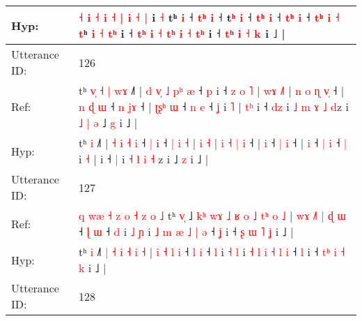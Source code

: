 \documentclass[10pt]{article}
\DeclareRobustCommand{\hl}[1]{{\textcolor{red}{#1}}}
\begin{document}
\begin{longtable}{ll}
 \\
Hyp: & \hl{}\hl{}\hl{˧} \hl{i} \hl{˧} \hl{i} \hl{˧} \hl{}\hl{|} \hl{i} \hl{˧} \hl{|} i\hl{}\hl{}\hl{}\hl{} \hl{}\hl{˧} tʰ \hl{}\hl{i} ˧ \hl{t}\hl{ʰ} \hl{i} ˧\hl{}\hl{} t\hl{ʰ} \hl{i} ˧ \hl{t}\hl{ʰ}\hl{ }\hl{i} ˧ \hl{t}\hl{ʰ} \hl{i} ˧ \hl{}\hl{t}\hl{ʰ} \hl{}\hl{i} \hl{˧} \hl{t}ʰ \hl{i} \hl{˧} \hl{}\hl{t}\hl{ʰ} i ˧\hl{}\hl{} \hl{t}\hl{ʰ} \hl{i} \hl{˧} \hl{}\hl{t}\hl{ʰ} \hl{i} \hl{˧} \hl{}\hl{t}\hl{ʰ} i ˧ \hl{t}\hl{ʰ} \hl{i} \hl{˧} \hl{k} i ˩ |
 \\
\midrule
Utterance ID: & 126 \\
Ref: & tʰ\hl{ }\hl{v}\hl{̩}\hl{ }\hl{˧}\hl{ }\hl{|} \hl{w}\hl{ɤ} ˩˥ |\hl{ }\hl{d} \hl{v}\hl{̩} \hl{˩} \hl{p}\hl{ʰ} \hl{æ} ˧ \hl{p} i ˧ \hl{z} \hl{o} \hl{˥} | \hl{w}\hl{ɤ} \hl{˩}\hl{˥} | \hl{n} \hl{o} \hl{ɳ} \hl{v}\hl{̩} ˧ |\hl{ }\hl{n}\hl{ }\hl{ɖ} \hl{ɯ} ˧ \hl{n} \hl{j}\hl{ɤ} ˧ |\hl{ }\hl{ʈ}\hl{ʂ}\hl{ʰ} \hl{ɯ} ˧ \hl{n} \hl{e} ˧ \hl{ʝ} i \hl{˥} |\hl{ }\hl{t}\hl{ʰ} i ˧ \hl{d}\hl{z} i \hl{˩} \hl{m} \hl{ɤ} \hl{˩} \hl{d}z i\hl{ }\hl{˩}\hl{ }\hl{|}\hl{ }\hl{ə} ˩ \hl{g} i ˩ |
 \\
Hyp: & tʰ\hl{}\hl{}\hl{}\hl{}\hl{}\hl{}\hl{} \hl{}\hl{i} ˩˥ |\hl{}\hl{} \hl{}\hl{˧} \hl{i} \hl{}\hl{˧} \hl{i} ˧ \hl{|} i ˧ \hl{|} \hl{i} \hl{˧} | \hl{}\hl{i} \hl{}\hl{˧} | \hl{i} \hl{˧} \hl{|} \hl{}\hl{i} ˧ |\hl{}\hl{}\hl{}\hl{} \hl{i} ˧ \hl{|} \hl{}\hl{i} ˧ |\hl{}\hl{}\hl{}\hl{} \hl{i} ˧ \hl{|} \hl{i} ˧ \hl{|} i \hl{˧} |\hl{}\hl{}\hl{} i ˧ \hl{}\hl{|} i \hl{˧} \hl{l} \hl{i} \hl{˧} \hl{}z i\hl{}\hl{}\hl{}\hl{}\hl{}\hl{} ˩ \hl{z} i ˩ |
 \\
\midrule
Utterance ID: & 127 \\
Ref: & \hl{q}\hl{ }\hl{w}\hl{æ}\hl{ }\hl{˧}\hl{ }\hl{z}\hl{ }\hl{o}\hl{ }\hl{˧}\hl{ }\hl{z}\hl{ }\hl{o}\hl{ }\hl{˩}\hl{ }tʰ \hl{v}\hl{̩} ˩\hl{ }\hl{k}\hl{ʰ}\hl{ }\hl{w}\hl{ɤ}\hl{ }\hl{˩} \hl{ʁ} \hl{o} \hl{˩} \hl{t}\hl{ʰ} \hl{o} \hl{˩} |\hl{ }\hl{w}\hl{ɤ} \hl{˩}\hl{˥} \hl{|} \hl{ɖ} \hl{ɯ} ˧ \hl{ɭ} \hl{ɯ} ˧ \hl{d} i \hl{˩} \hl{ɲ} i \hl{˩} \hl{m} \hl{æ} \hl{˩} \hl{|} \hl{ə} ˧ \hl{ʝ} i ˧ \hl{}\hl{ʂ} \hl{ɯ} \hl{˥} \hl{ʝ} i ˩ |
 \\
Hyp: & \hl{}\hl{}\hl{}\hl{}\hl{}\hl{}\hl{}\hl{}\hl{}\hl{}\hl{}\hl{}\hl{}\hl{}\hl{}\hl{}\hl{}\hl{}\hl{}tʰ \hl{}\hl{i} ˩\hl{}\hl{}\hl{}\hl{}\hl{}\hl{}\hl{}\hl{˥} \hl{|} \hl{˧} \hl{i} \hl{}\hl{˧} \hl{i} \hl{˧} |\hl{}\hl{}\hl{} \hl{}\hl{i} \hl{˧} \hl{l} \hl{i} ˧ \hl{l} \hl{i} ˧ \hl{l} i \hl{˧} \hl{l} i \hl{˧} \hl{l} \hl{i} \hl{˧} \hl{l} \hl{i} ˧ \hl{l} i ˧ \hl{t}\hl{ʰ} \hl{i} \hl{˧} \hl{k} i ˩ |
 \\
\midrule
Utterance ID: & 128 \\

\end{longtable}
\end{document}
